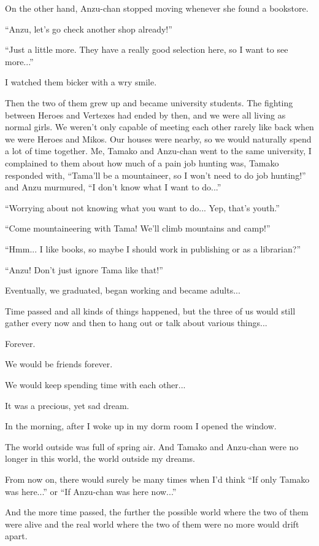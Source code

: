 On the other hand, Anzu-chan stopped moving whenever she found a bookstore.

``Anzu, let's go check another shop already!''

``Just a little more. They have a really good selection here, so I want to see more...''

I watched them bicker with a wry smile.

Then the two of them grew up and became university students. The fighting between Heroes and Vertexes had ended by then, and we were all living as normal girls. We weren't only capable of meeting each other rarely like back when we were Heroes and Mikos. Our houses were nearby, so we would naturally spend a lot of time together. Me, Tamako and Anzu-chan went to the same university, I complained to them about how much of a pain job hunting was, Tamako responded with, ``Tama'll be a mountaineer, so I won't need to do job hunting!'' and Anzu murmured, ``I don't know what I want to do...''

``Worrying about not knowing what you want to do... Yep, that's youth.''

``Come mountaineering with Tama! We'll climb mountains and camp!''

``Hmm... I like books, so maybe I should work in publishing or as a librarian?''

``Anzu! Don't just ignore Tama like that!''

Eventually, we graduated, began working and became adults...

Time passed and all kinds of things happened, but the three of us would still gather every now and then to hang out or talk about various things...

Forever.

We would be friends forever.

We would keep spending time with each other...

It was a precious, yet sad dream.

In the morning, after I woke up in my dorm room I opened the window.

The world outside was full of spring air. And Tamako and Anzu-chan were no longer in this world, the world outside my dreams.

From now on, there would surely be many times when I'd think ``If only Tamako was here...'' or ``If Anzu-chan was here now...''

And the more time passed, the further the possible world where the two of them were alive and the real world where the two of them were no more would drift apart.

